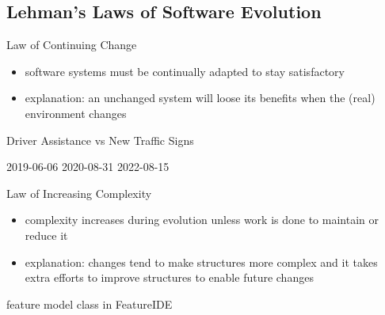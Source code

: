 \subsection{Lehman's Laws of Software Evolution}
\begin{frame}{\insertsubsection}
	\begin{fancycolumns}[widths={60}]
		\begin{definition}{Law of Continuing Change\mysource{\lehmanslaws}}
			\begin{itemize}
				\item software systems must be continually adapted to stay satisfactory %
				\item explanation: an unchanged system will loose its benefits when the (real) environment changes
			\end{itemize}
		\end{definition}
		\begin{example}{Driver Assistance vs New Traffic Signs}
			\begin{fancycolumns}[b,columns=3,animation=none]
				\centering{}
				2019-06-06
			\nextcolumn
				\centering{}
				2020-08-31
			\nextcolumn
				\centering{}
				2022-08-15
			\end{fancycolumns}
		\end{example}
		\nextcolumn
		\centering{}
	\end{fancycolumns}
\end{frame}

\begin{frame}{\insertsubsection}
	\begin{fancycolumns}
		\begin{definition}{Law of Increasing Complexity\mysource{\lehmanslaws}}
			\begin{itemize}
				\item complexity increases during evolution unless work is done to maintain or reduce it %
				\item explanation: changes tend to make structures more complex and it takes extra efforts to improve structures to enable future changes
			\end{itemize}
		\end{definition}
		\begin{example}{}
			feature model class in FeatureIDE
		\end{example}
		\nextcolumn
	\end{fancycolumns}
\end{frame}

